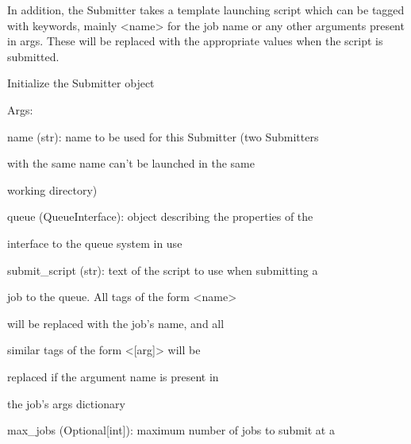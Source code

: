 \documentclass[letterpaper,10pt,english]{sphinxmanual}
\begin{document}
\begin{fulllineitems}
\begin{enumerate}
\end{enumerate}

In addition, the Submitter takes a template launching script which can
be tagged with keywords, mainly \textless{}name\textgreater{} for the job name or any other
arguments present in args. These will be replaced with the appropriate
values when the script is submitted.

Initialize the Submitter object

\begin{DUlineblock}{0em}
\item[] Args:
\item[]
\begin{DUlineblock}{\DUlineblockindent}
\item[] name (str): name to be used for this Submitter (two Submitters
\item[]
\begin{DUlineblock}{\DUlineblockindent}
\item[] with the same name can't be launched in the same
\item[] working directory)
\end{DUlineblock}
\item[] queue (QueueInterface): object describing the properties of the
\item[]
\begin{DUlineblock}{\DUlineblockindent}
\item[] interface to the queue system in use
\end{DUlineblock}
\item[] submit\_script (str): text of the script to use when submitting a
\item[]
\begin{DUlineblock}{\DUlineblockindent}
\item[] job to the queue. All tags of the form \textless{}name\textgreater{}
\item[] will be replaced with the job's name, and all
\item[] similar tags of the form \textless{}{[}arg{]}\textgreater{} will be
\item[] replaced if the argument name is present in
\item[] the job's args dictionary
\end{DUlineblock}
\item[] max\_jobs (Optional{[}int{]}): maximum number of jobs to submit at a
\item[]
\begin{DUlineblock}{\DUlineblockindent}

\end{DUlineblock}
\end{DUlineblock}
\end{DUlineblock}
\end{fulllineitems}
\end{document}
